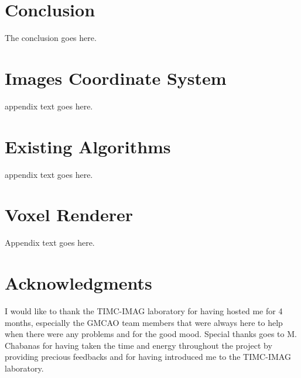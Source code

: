 \documentclass[12pt,journal,compsoc]{IEEEtran}
\begin{document}
\section{Conclusion}
The conclusion goes here.



\appendices
\section{Images Coordinate System}
appendix text goes here.

\section{Existing Algorithms}
appendix text goes here.

\section{Voxel Renderer}
Appendix text goes here.

\section*{Acknowledgments}
I would like to thank the TIMC-IMAG laboratory for having hosted me for 4 months, especially the GMCAO team members that were always here to help when there were any problems and for the good mood. Special thanks goes to M. Chabanas for having taken the time and energy throughout the project by providing precious feedbacks and for having introduced me to the TIMC-IMAG laboratory.

\ifCLASSOPTIONcaptionsoff
  \newpage
\fi






% 
\end{document}
